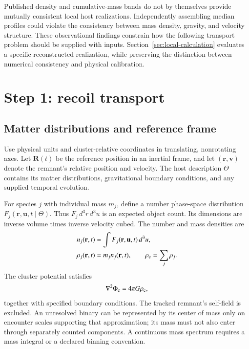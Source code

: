 \documentclass[aps,prd,reprint,amsmath,amssymb,superscriptaddress,nofootinbib,longbibliography,floatfix]{revtex4-2}
\begin{document}
Published density and cumulative-mass bands do not by themselves provide mutually consistent local host realizations. Independently assembling median profiles could violate the consistency between mass density, gravity, and velocity structure. These observational findings constrain how the following transport problem should be supplied with inputs. Section~\ref{sec:local-calculation} evaluates a specific reconstructed realization, while preserving the distinction between numerical consistency and physical calibration.

\section{Step 1: recoil transport}\label{sec:transport}

\subsection{Matter distributions and reference frame}

Use physical units and cluster-relative coordinates in translating, nonrotating axes. Let $\mathbf R(t)$ be the reference position in an inertial frame, and let $(\mathbf r,\mathbf v)$ denote the remnant's relative position and velocity. The host description $\Theta$ contains its matter distributions, gravitational boundary conditions, and any supplied temporal evolution.

For species $j$ with individual mass $m_j$, define a number phase-space distribution
$F_j(\mathbf r,\mathbf u,t\mid\Theta)$. Thus
$F_j\,d^3r\,d^3u$ is an expected object count. Its dimensions are inverse volume times inverse velocity cubed. The number and mass densities are
\begin{align}
n_j(\mathbf r,t)&=\int F_j(\mathbf r,\mathbf u,t)\,d^3u,
\label{eq:number-density}\\
\rho_j(\mathbf r,t)&=m_jn_j(\mathbf r,t),\qquad
\rho_{\rm c}=\sum_j\rho_j.
\label{eq:mass-density}
\end{align}
The cluster potential satisfies
\begin{equation}
\nabla^2\Phi_{\rm c}=4\pi G\rho_{\rm c},
\label{eq:poisson}
\end{equation}
together with specified boundary conditions. The tracked remnant's self-field is excluded. An unresolved binary can be represented by its center of mass only on encounter scales supporting that approximation; its mass must not also enter through separately counted components. A continuous mass spectrum requires a mass integral or a declared binning convention.
\end{document}
